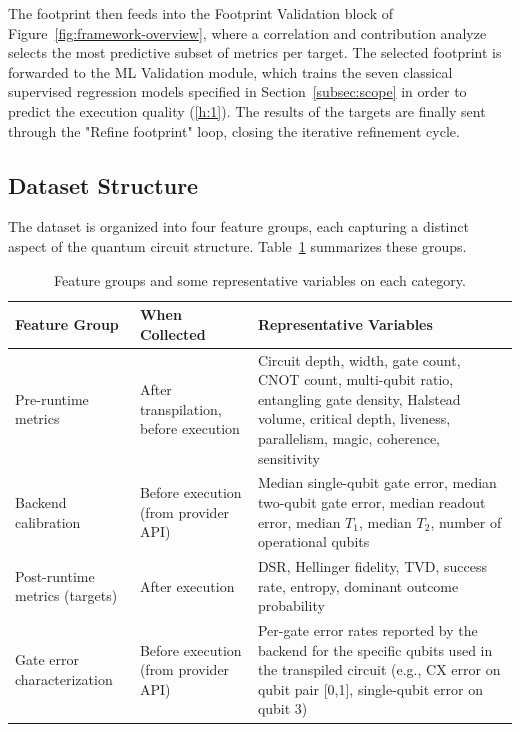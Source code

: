 \documentclass{article}
\begin{document}
The footprint then feeds into the Footprint Validation block of Figure~\ref{fig:framework-overview}, where a correlation and contribution analyze selects the most predictive subset of metrics per target. The selected footprint is forwarded to the ML Validation module, which trains the seven classical supervised regression models specified in Section~\ref{subsec:scope} in order to predict the execution quality (\ref{h:1}). The results of the targets are finally sent through the "Refine footprint" loop, closing the iterative refinement cycle.

\subsection{Dataset Structure}
\label{subsec:dataset-validation}

The dataset is organized into four feature groups, each capturing a distinct aspect of the quantum circuit structure. Table~\ref{tab:dataset-structure} summarizes these groups.

\begin{table}[ht]
\renewcommand{\arraystretch}{1.1}
\centering
\caption{Feature groups and some representative variables on each category.}
\label{tab:dataset-structure}
\footnotesize
\begin{tabular}{|p{2cm}|p{3cm}|p{5.8cm}|}
\hline
\textbf{Feature Group} & \textbf{When Collected} & \textbf{Representative Variables} \\
\hline
Pre-runtime metrics & After transpilation, before execution & Circuit depth, width, gate count, CNOT count, multi-qubit ratio, entangling gate density, Halstead volume, critical depth, liveness, parallelism, magic, coherence, sensitivity \\
\hline
Backend calibration & Before execution (from provider API) & Median single-qubit gate error, median two-qubit gate error, median readout error, median $T_1$, median $T_2$, number of operational qubits \\
\hline
Post-runtime metrics (targets) & After execution & DSR, Hellinger fidelity, TVD, success rate, entropy, dominant outcome probability \\
\hline
Gate error characterization & Before execution (from provider API) & Per-gate error rates reported by the backend for the specific qubits used in the transpiled circuit (e.g., CX error on qubit pair [0,1], single-qubit error on qubit 3) \\
\hline
\end{tabular}
\end{table}
\end{document}
